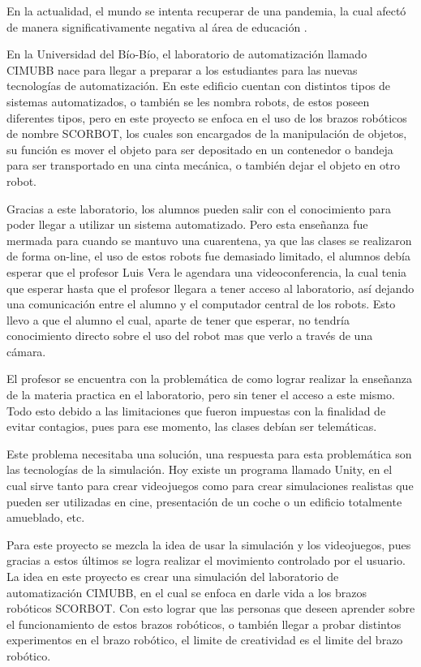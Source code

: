 En la actualidad, el mundo se intenta recuperar de una pandemia, la cual afectó de manera significativamente negativa al área de educación \cite{Educacion}.

En la Universidad del Bío-Bío, el laboratorio de automatización llamado CIMUBB nace para llegar a preparar a los estudiantes para las nuevas tecnologías de automatización. En este edificio cuentan con distintos tipos de sistemas automatizados, o también se les nombra robots, de estos poseen diferentes tipos, pero en este proyecto se enfoca en el uso de los brazos robóticos de nombre SCORBOT, los cuales son encargados de la manipulación de objetos, su función es mover el objeto para ser depositado en un contenedor o bandeja para ser transportado en una cinta mecánica, o también dejar el objeto en otro robot. 

Gracias a este laboratorio, los alumnos pueden salir con el conocimiento para poder llegar a utilizar un sistema automatizado. Pero esta enseñanza fue mermada para cuando se mantuvo una cuarentena, ya que las clases se realizaron de forma on-line, el uso de estos robots fue demasiado limitado, el alumnos debía esperar que el profesor Luis Vera le agendara una videoconferencia, la cual tenia que esperar hasta que el profesor llegara a tener acceso al laboratorio, así dejando una comunicación entre el alumno y el computador central de los robots. Esto llevo a que el alumno el cual, aparte de tener que esperar, no tendría conocimiento directo sobre el uso del robot mas que verlo a través de una cámara.

El profesor se encuentra con la problemática de como lograr realizar la enseñanza de la materia practica en el laboratorio, pero sin tener el acceso a este mismo. Todo esto debido a las limitaciones que fueron impuestas con la finalidad de evitar contagios, pues para ese momento, las clases debían ser telemáticas.

Este problema necesitaba una solución, una respuesta para esta problemática son las tecnologías de la simulación. Hoy existe un programa llamado Unity, en el cual sirve tanto para crear videojuegos como para crear simulaciones realistas que pueden ser utilizadas en cine, presentación de un coche o un edificio totalmente amueblado, etc.

Para este proyecto se mezcla la idea de usar la simulación y los videojuegos, pues gracias a estos últimos se logra realizar el movimiento controlado por el usuario. La idea en este proyecto es crear una simulación del laboratorio de automatización CIMUBB, en el cual se enfoca en darle vida a los brazos robóticos SCORBOT. Con esto lograr que las personas que deseen aprender sobre el funcionamiento de estos brazos robóticos, o también llegar a probar distintos experimentos en el brazo robótico, el limite de creatividad es el limite del brazo robótico.


